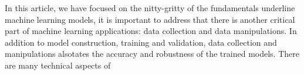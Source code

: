 In this article, we have focused on the nitty-gritty of the fundamentals underline machine learning models, it is important to address that there is another critical part of machine learning applications: data collection and data manipulations. In addition to model construction, training and validation, data collection and manipulations alsotates the accuracy and robustness of the trained models. There are many technical aspects of 